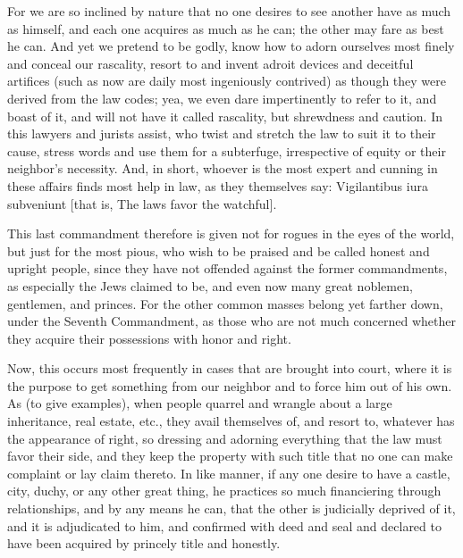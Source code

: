 For we are so inclined by nature that no one desires to see another
have as much as himself, and each one acquires as much as he can; the
other may fare as best he can. And yet we pretend to be godly, know how
to adorn ourselves most finely and conceal our rascality, resort to and
invent adroit devices and deceitful artifices (such as now are daily
most ingeniously contrived) as though they were derived from the law
codes; yea, we even dare impertinently to refer to it, and boast of it,
and will not have it called rascality, but shrewdness and caution. In
this lawyers and jurists assist, who twist and stretch the law to suit
it to their cause, stress words and use them for a subterfuge,
irrespective of equity or their neighbor's necessity. And, in short,
whoever is the most expert and cunning in these affairs finds most help
in law, as they themselves say: Vigilantibus iura subveniunt [that is,
The laws favor the watchful].

This last commandment therefore is given not for rogues in the eyes of
the world, but just for the most pious, who wish to be praised and be
called honest and upright people, since they have not offended against
the former commandments, as especially the Jews claimed to be, and even
now many great noblemen, gentlemen, and princes. For the other common
masses belong yet farther down, under the Seventh Commandment, as those
who are not much concerned whether they acquire their possessions with
honor and right.

Now, this occurs most frequently in cases that are brought into court,
where it is the purpose to get something from our neighbor and to force
him out of his own. As (to give examples), when people quarrel and
wrangle about a large inheritance, real estate, etc., they avail
themselves of, and resort to, whatever has the appearance of right, so
dressing and adorning everything that the law must favor their side,
and they keep the property with such title that no one can make
complaint or lay claim thereto. In like manner, if any one desire to
have a castle, city, duchy, or any other great thing, he practices so
much financiering through relationships, and by any means he can, that
the other is judicially deprived of it, and it is adjudicated to him,
and confirmed with deed and seal and declared to have been acquired by
princely title and honestly.

